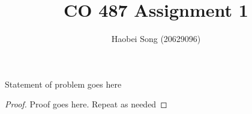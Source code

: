 \documentclass[12pt]{article}
\newenvironment{problem}[2][Problem]{\begin{trivlist}
\item[\hskip \labelsep {\bfseries #1}\hskip \labelsep {\bfseries #2.}]}{\end{trivlist}}
\begin{document}
\title{CO 487 Assignment 1}
\author{Haobei Song (20629096)}
\maketitle

\begin{problem}{x.yz}
Statement of problem goes here
\end{problem}

\begin{proof}
Proof goes here. Repeat as needed
\end{proof}
\end{document}

